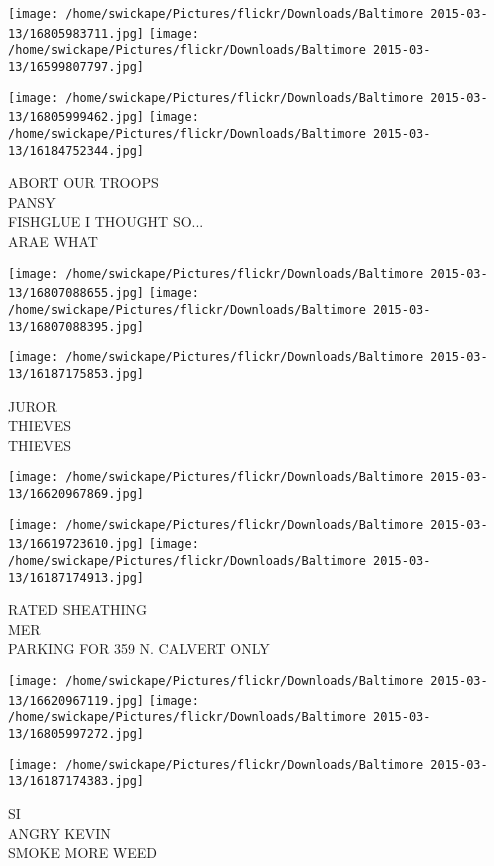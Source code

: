 \documentclass[10pt,letterpaper]{article}
\begin{document}
\texttt{[image: /home/swickape/Pictures/flickr/Downloads/Baltimore 2015-03-13/16805983711.jpg]}
\texttt{[image: /home/swickape/Pictures/flickr/Downloads/Baltimore 2015-03-13/16599807797.jpg]}

\texttt{[image: /home/swickape/Pictures/flickr/Downloads/Baltimore 2015-03-13/16805999462.jpg]}
\texttt{[image: /home/swickape/Pictures/flickr/Downloads/Baltimore 2015-03-13/16184752344.jpg]}

ABORT OUR TROOPS\\
PANSY\\
FISHGLUE I THOUGHT SO...\\
ARAE WHAT\\
\pagebreak

\texttt{[image: /home/swickape/Pictures/flickr/Downloads/Baltimore 2015-03-13/16807088655.jpg]}
\texttt{[image: /home/swickape/Pictures/flickr/Downloads/Baltimore 2015-03-13/16807088395.jpg]}

\texttt{[image: /home/swickape/Pictures/flickr/Downloads/Baltimore 2015-03-13/16187175853.jpg]}

JUROR\\
THIEVES\\
THIEVES\\
\pagebreak

\texttt{[image: /home/swickape/Pictures/flickr/Downloads/Baltimore 2015-03-13/16620967869.jpg]}

\vspace{0.25in}
\texttt{[image: /home/swickape/Pictures/flickr/Downloads/Baltimore 2015-03-13/16619723610.jpg]}
\texttt{[image: /home/swickape/Pictures/flickr/Downloads/Baltimore 2015-03-13/16187174913.jpg]}

RATED SHEATHING\\
MER\\
PARKING FOR 359 N. CALVERT ONLY\\
\pagebreak

\texttt{[image: /home/swickape/Pictures/flickr/Downloads/Baltimore 2015-03-13/16620967119.jpg]}
\texttt{[image: /home/swickape/Pictures/flickr/Downloads/Baltimore 2015-03-13/16805997272.jpg]}

\texttt{[image: /home/swickape/Pictures/flickr/Downloads/Baltimore 2015-03-13/16187174383.jpg]}

SI\\
ANGRY KEVIN\\
SMOKE MORE WEED\\
\pagebreak
\end{document}
